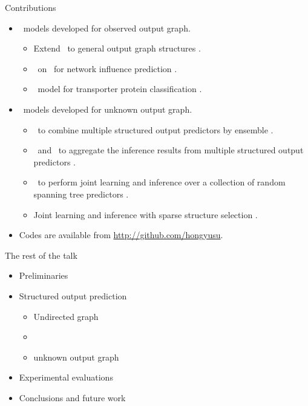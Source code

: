 \documentclass[first=dgreen,second=purple,logo=red]{aaltoslides}
\begin{document}
%
\begin{frame}{Contributions}
	\begin{itemize}\footnotesize
		\item \sop\ models developed for observed output graph.
		\begin{itemize}\footnotesize
			\item Extend \mmcrf\ to general output graph structures \cite{su10structured}.
			\item \spin\ on \daggraph\ for network influence prediction \cite{su14structured}.
			\item \sop\ model for transporter protein classification \cite{su2015transporter}.
		\end{itemize}
		\item \sop\ models developed for unknown output graph.
		\begin{itemize}\footnotesize
			\item \mve\ to combine multiple structured output predictors by ensemble \cite{su11mutitask}.
			\item \amm\ and \mam\ to aggregate the inference results from multiple structured output predictors \cite{su2013multilabelacml,su15multilabel}.
			\item \rta\ to perform joint learning and inference over a collection of random spanning tree predictors \cite{su14multilabelnips}.
			\item Joint learning and inference with sparse structure selection \cite{Cousins2015large,Cousins2015mutiple}.
		\end{itemize}
		\item Codes are available from \href{https://github.com/hongyusu?tab=repositories}{http://github.com/hongyusu}.
	\end{itemize}
\end{frame}


%
\begin{frame}{The rest of the talk}
	\begin{itemize}\footnotesize
		\item Preliminaries
		\item Structured output prediction
		\begin{itemize}\footnotesize
			\item Undirected graph
			\item \daggraph
			\item unknown output graph
		\end{itemize}
		\item Experimental evaluations
		\item Conclusions and future work
	\end{itemize}
\end{frame}
\end{document}
